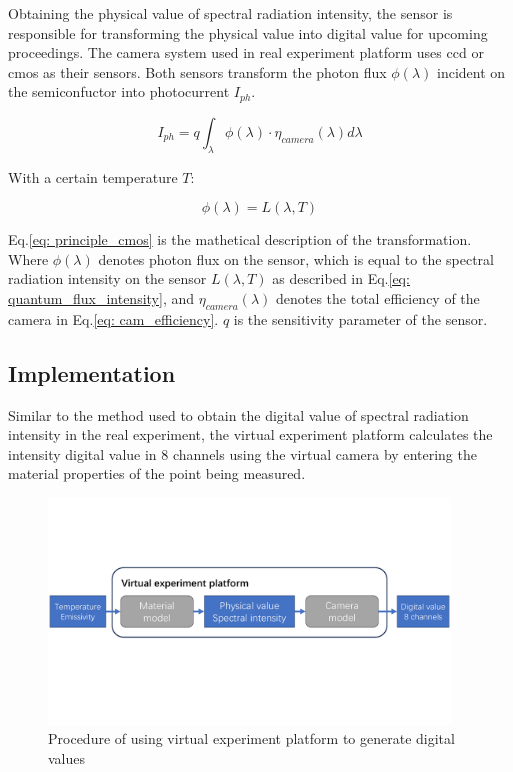 Obtaining the physical value of spectral radiation intensity, the sensor is responsible 
for transforming the physical value into digital value for upcoming proceedings.
The camera system used in real experiment platform uses \gls{ccd} or \gls{cmos}
as their sensors. Both sensors transform the photon flux $\phi (\lambda)$ 
incident on the semiconfuctor into photocurrent $I_{ph}$\cite{Fossum.2014}. 

\begin{equation}
    \label{eq: principle_cmos}
    I_{ph} = q \int_{\lambda}^{} \phi(\lambda) \cdot \eta_{camera}(\lambda) d\lambda
\end{equation}

With a certain temperature $T$: 

\begin{equation}
    \label{eq: quantum_flux_intensity}
    \phi(\lambda) = L(\lambda, T)
\end{equation}

Eq.\ref{eq: principle_cmos} is the mathetical description of the 
transformation. Where $\phi(\lambda)$ denotes photon flux on the sensor, 
which is equal to the spectral radiation intensity on the sensor $L(\lambda, T)$ as 
described in Eq.\ref{eq: quantum_flux_intensity}, and $\eta_{camera}(\lambda)$
denotes the total efficiency of the camera in Eq.\ref{eq: cam_efficiency}. $q$ is the sensitivity parameter 
of the sensor.


\subsection{Implementation}
Similar to the method used to obtain the digital value of spectral radiation intensity 
in the real experiment, the virtual experiment platform calculates the 
intensity digital value in 8 channels using the virtual camera by entering 
the material properties of the point being measured.


\begin{figure}[htbp]
    \centering
    \includegraphics[width=0.95\textwidth]{figures/camera_model.pdf}
    \caption{Procedure of using virtual experiment platform to generate digital values}
    \label{fig: process_virtual_platform}
\end{figure}

